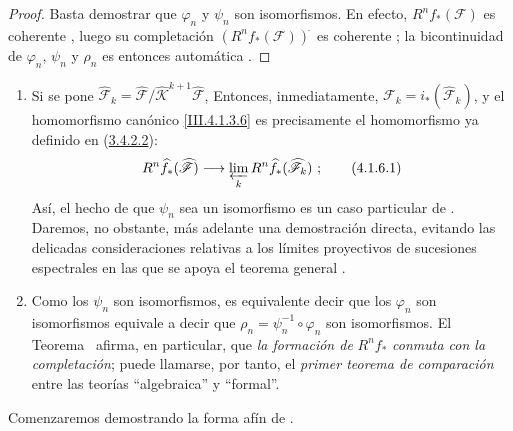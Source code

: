 \begin{proof}
Basta demostrar que $\varphi_n$ y $\psi_n$ son isomorfismos.
En efecto, $R^nf_*(\mathcal F)$ es coherente , luego
su completación $(R^nf_*(\mathcal F))^{\widehat{\,}}$ es coherente
; la bicontinuidad de $\varphi_n$, $\psi_n$ y
$\rho_n$ es entonces automática .
\end{proof}

\begin{remarks}[4.1.6]
\label{III.4.1.6-fr}
\upshape
\begin{enumerate}
\item[(i)] Si se pone $\widehat{\mathcal F}_k=
\widehat{\mathcal F}/\widehat{\mathcal K}^{k+1}
\widehat{\mathcal F}$,
  Entonces, inmediatamente,
  $\mathcal F_k=i_*(\widehat{\mathcal F}_k)$,
  y el homomorfismo canónico \eqref{III.4.1.3.6} es precisamente el
  homomorfismo ya definido en (\hyperref[III.3.4.2.2]{3.4.2.2}):
  \[
R^n\widehat f_*(\widehat{\mathcal F})
\longrightarrow\varprojlim_kR^n\widehat f_*(\widehat{\mathcal F}_k)~;
\tag{4.1.6.1}\label{III.4.1.6.1-fr}
\]
  Así, el hecho de que $\psi_n$ sea un isomorfismo es un caso particular
  de .
  Daremos, no obstante, más adelante una demostración directa, evitando
  las delicadas consideraciones relativas a los límites proyectivos de
  sucesiones espectrales  en las que se apoya el teorema
  general .

  \item[(ii)] Como los $\psi_n$ son isomorfismos, es equivalente decir que los $\varphi_n$ son isomorfismos equivale a decir que
  $\rho_n=\psi_n^{-1}\circ\varphi_n$
  son isomorfismos.
  El Teorema~ afirma, en particular, que \emph{la formación de}
  $R^nf_*$ \emph{conmuta con la completación}; puede llamarse, por tanto, el
  \emph{primer teorema de comparación} entre las teorías ``algebraica'' y
  ``formal''.
\end{enumerate}
Comenzaremos demostrando la forma afín de .
\end{remarks}

